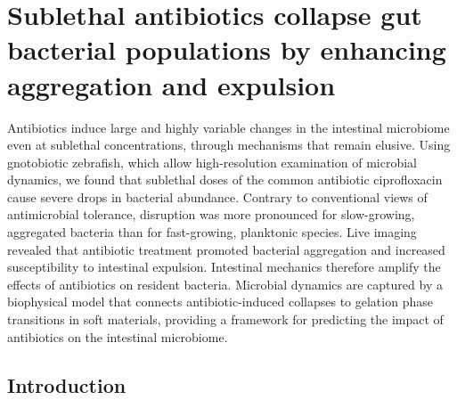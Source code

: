 
\def\reals{\mathbb{R}}
\def\be{\begin{equation}}
\def\ee{\end{equation}}
\def\bea{\begin{eqnarray}}
\def\eea{\end{eqnarray}}
\def\bml{\begin{mathletters}}
\def\eml{\end{mathletters}}
\def\bse{\begin{subequations}}
\def\ese{\end{subequations}}
\def\expec{\mathbb{E}}
\def\exp{\text{exp}}
\def\Var{\text{Var}}
\def\e{\text{e}}
\def\ba{\begin{align}}
\def\ea{\end{align}}

\chapter{Sublethal antibiotics collapse gut bacterial populations by enhancing aggregation and expulsion}


Antibiotics induce large and highly variable changes in the intestinal microbiome even at sublethal concentrations, through mechanisms that remain elusive. Using gnotobiotic zebrafish, which allow high-resolution examination of microbial dynamics, we found that sublethal doses of the common antibiotic ciprofloxacin cause severe drops in bacterial abundance. Contrary to conventional views of antimicrobial tolerance, disruption was more pronounced for slow-growing, aggregated bacteria than for fast-growing, planktonic species. Live imaging revealed that antibiotic treatment promoted bacterial aggregation and increased susceptibility to intestinal expulsion. Intestinal mechanics therefore amplify the effects of antibiotics on resident bacteria. Microbial dynamics are captured by a biophysical model that connects antibiotic-induced collapses to gelation phase transitions in soft materials, providing a framework for predicting the impact of antibiotics on the intestinal microbiome.












 \section{Introduction}


